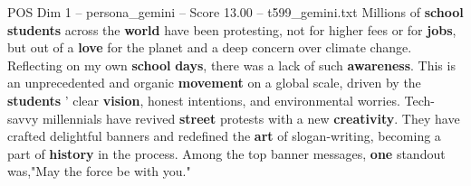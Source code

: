 \begin{textsample}{POS Dim 1 – persona\_gemini – Score 13.00 – t599\_gemini.txt}  \label{ex:f1_pos_045}
Millions of \textbf{school} \textbf{students} across the \textbf{world} have been protesting, not for higher fees or for \textbf{jobs}, but out of a \textbf{love} for the planet and a deep concern over climate change.
Reflecting on my own \textbf{school} \textbf{days}, there was a lack of such \textbf{awareness}.
This is an unprecedented and organic \textbf{movement} on a global scale, driven by the \textbf{students} ' clear \textbf{vision}, honest intentions, and environmental worries.
Tech-savvy millennials have revived \textbf{street} protests with a new \textbf{creativity}.
They have crafted delightful banners and redefined the \textbf{art} of slogan-writing, becoming a part of \textbf{history} in the process.
Among the top banner messages, \textbf{one} standout was,"May the force be with you."

\end{textsample}
